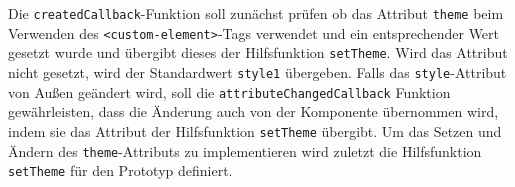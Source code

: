 \begin{Shaded}
\begin{Highlighting}[]
 \OperatorTok{=} \NormalTok{() }\OperatorTok{\{}
   \NormalTok{(}\NormalTok{(}\NormalTok{)) }\OperatorTok{\{}
     \OperatorTok{=} \NormalTok{(}\NormalTok{)}\OperatorTok{;}
    \OperatorTok{;}
  \OperatorTok{\}}  \OperatorTok{\{}
    \NormalTok{(}\NormalTok{)}\OperatorTok{;}
  \OperatorTok{\}}
\OperatorTok{\};}

 \OperatorTok{=} \OperatorTok{,} \OperatorTok{,} \OperatorTok{\{}
   \OperatorTok{===} \NormalTok{) }\OperatorTok{\{}
    \OperatorTok{;}
  \OperatorTok{\}}
\OperatorTok{\};}
\end{Highlighting}
\end{Shaded}

Die \texttt{createdCallback}-Funktion soll zunächst prüfen ob das Attribut \texttt{theme} beim Verwenden des
\texttt{\textless{}custom-element\textgreater{}}-Tags verwendet und ein entsprechender Wert gesetzt wurde und übergibt dieses der Hilfsfunktion \texttt{setTheme}. Wird das Attribut nicht gesetzt, wird der Standardwert \texttt{style1} übergeben. Falls das \texttt{style}-Attribut von Außen geändert wird, soll die \texttt{attributeChangedCallback} Funktion gewährleisten, dass die Änderung auch von der Komponente übernommen wird, indem sie das Attribut der Hilfsfunktion \texttt{setTheme} übergibt. Um das Setzen und Ändern des \texttt{theme}-Attributs zu implementieren wird zuletzt die Hilfsfunktion \texttt{setTheme} für den Prototyp definiert.

\begin{Shaded}
\begin{Highlighting}[]
 \OperatorTok{=} \OperatorTok{\{}
   \OperatorTok{=} \OperatorTok{;}
   \OperatorTok{=}  \OperatorTok{+} \OperatorTok{;}
\OperatorTok{\};}
\end{Highlighting}
\end{Shaded}

